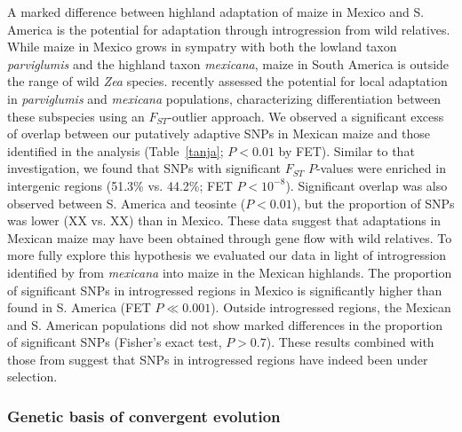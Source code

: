 {{A marked difference between highland adaptation of maize in Mexico and S. America is the potential for adaptation through introgression from wild relatives.  While maize in Mexico grows in sympatry with both the lowland taxon \textit{parviglumis} and the highland taxon \textit{mexicana}, maize in South America is outside the range of wild \textit{Zea} species.
 \citet{Pyhajarvi2013} recently assessed the potential for local adaptation in \textit{parviglumis} and \textit{mexicana} populations, characterizing differentiation between these subspecies using an $F_{ST}$-outlier approach.
We observed a significant excess of overlap between our putatively adaptive SNPs in Mexican maize and those identified in the \citet{Pyhajarvi2013} analysis (Table~\ref{tanja}; $P<0.01$ by FET). Similar to that investigation, we found that SNPs with significant $F_{ST}$ $P$-values were enriched in intergenic regions (51.3\% vs. 44.2\%; FET $P < 10^{-8}$). Significant overlap was also observed between S. America and teosinte ($P<0.01$), but the proportion of SNPs was lower (XX vs. XX)  than in Mexico.  These data suggest that adaptations in Mexican maize may have been obtained through gene flow with wild relatives.  To more fully explore this hypothesis we evaluated our data in light of introgression identified by \citep{Profford_2013} from \textit{mexicana} into maize in the Mexican highlands.  
The proportion of significant SNPs in introgressed regions in Mexico is significantly higher than found in S. America (FET $P\ll0.001$).
Outside introgressed regions, the Mexican and S. American populations did not show marked differences in the proportion of significant SNPs (Fisher's exact test, $P>0.7$). These results combined with those from \citep{Profford_2013} suggest that SNPs in introgressed regions have indeed been under selection.  


\subsubsection{Genetic basis of convergent evolution}

}}

